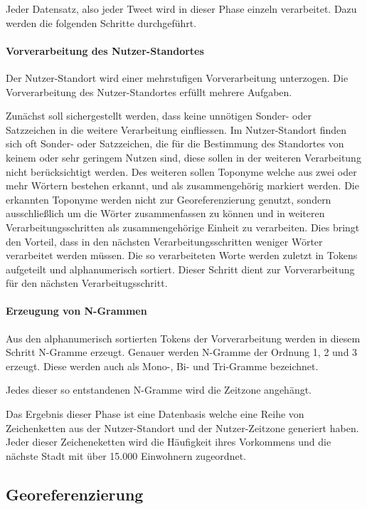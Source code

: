 	Jeder Datensatz, also jeder Tweet wird in dieser Phase einzeln verarbeitet. 
	Dazu werden die folgenden Schritte durchgeführt.

	\paragraph{Vorverarbeitung des Nutzer-Standortes} 
	Der Nutzer-Standort wird einer mehrstufigen Vorverarbeitung unterzogen.
	Die Vorverarbeitung des Nutzer-Standortes erfüllt mehrere Aufgaben. 

	Zunächst soll sichergestellt werden, dass keine unnötigen Sonder- oder Satzzeichen in die weitere Verarbeitung einfliessen. 
	Im Nutzer-Standort finden sich oft Sonder- oder Satzzeichen, die für die Bestimmung des Standortes von keinem oder sehr geringem Nutzen sind, diese sollen in der weiteren Verarbeitung nicht berücksichtigt werden.
  	Des weiteren sollen Toponyme welche aus zwei oder mehr Wörtern bestehen  erkannt, und als zusammengehörig markiert werden.
  	Die erkannten Toponyme werden nicht zur Georeferenzierung genutzt, sondern ausschließlich um die Wörter zusammenfassen zu können und in weiteren Verarbeitungsschritten als zusammengehörige Einheit zu verarbeiten.
  	Dies bringt den Vorteil, dass in den nächsten Verarbeitungsschritten weniger Wörter verarbeitet werden müssen.
  	Die so verarbeiteten Worte werden zuletzt in Tokens aufgeteilt und alphanumerisch sortiert. 
  	Dieser Schritt dient zur Vorverarbeitung für den nächsten Verarbeitugsschritt.

  	\paragraph{Erzeugung von N-Grammen}
  	Aus den alphanumerisch sortierten Tokens der Vorverarbeitung werden in diesem Schritt N-Gramme erzeugt.
  	Genauer werden N-Gramme der Ordnung 1, 2 und 3 erzeugt.
  	Diese werden auch als Mono-, Bi- und Tri-Gramme bezeichnet.  

  	Jedes dieser so entstandenen N-Gramme wird die Zeitzone angehängt.  

	 

	Das Ergebnis dieser Phase ist eine Datenbasis welche eine Reihe von Zeichenketten aus der Nutzer-Standort und der Nutzer-Zeitzone generiert haben. 
	Jeder dieser Zeicheneketten wird die Häufigkeit ihres Vorkommens und die nächste Stadt mit über 15.000 Einwohnern zugeordnet. 


	\subsection{Georeferenzierung}  

